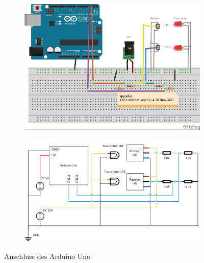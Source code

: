 \begin{figure}[ht]
    \centering
    \begin{subfigure}[c]{0.8\textwidth}       
        \includegraphics[width=\textwidth]{images/fritzing.jpg}
\null       
    \end{subfigure}
    
    \begin{subfigure}[c]{0.8\textwidth}
        \includegraphics[width=\textwidth]{images/SchemaVisio.png}
    \end{subfigure}
    \caption{Anschluss des Arduino Uno}
    \label{fig:ArdAns}
\end{figure}

